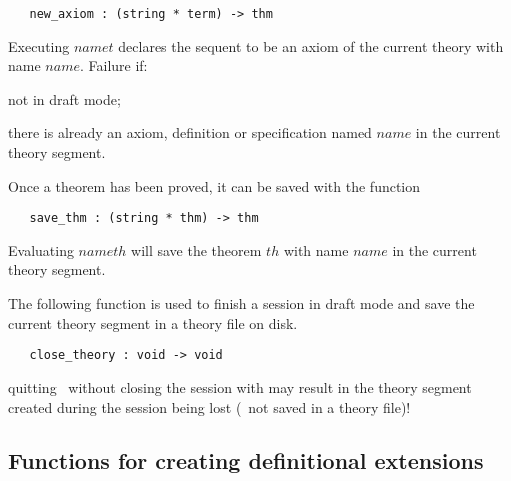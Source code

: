 \begin{boxed}
\begin{verbatim}
   new_axiom : (string * term) -> thm
\end{verbatim}\end{boxed}


\noindent Executing $name$$t$\ml{)} declares the
sequent
 to be an axiom of the current theory with name $name$.
Failure if:
\begin{myenumerate}
\item not in draft mode;
\item there is already an axiom, definition or specification
named $name$ in the current theory segment.
\end{myenumerate}


Once a theorem has been proved, it can be saved with the function

\begin{boxed}
\begin{verbatim}
   save_thm : (string * thm) -> thm
\end{verbatim}\end{boxed}

\noindent
Evaluating $name$$th$\ml{)} will save the theorem
$th$ with name $name$ in the current theory segment.

The following function is used to finish a session in  draft mode  and save the
current theory segment in a theory file on disk.

\begin{boxed}
\begin{verbatim}
   close_theory : void -> void
\end{verbatim}\end{boxed}

 quitting \HOL\ without closing the session with
 may result in the theory segment created during the session
being lost (\ie\ not saved in a theory file)!

\subsection{Functions for creating definitional extensions}
\label{avra_definitional}

